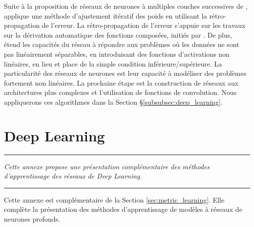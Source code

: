 Suite à la proposition de réseaux de neurones à multiples couches successives de \citeauthor{fukushima_neocognitron_1980} \cite{fukushima_neocognitron_1980}, \citeauthor{rumelhart_learning_1985} \cite{rumelhart_learning_1985} applique une méthode d'ajustement itératif des poids en utilisant la rétro-propagation de l'erreur.
La rétro-propagation de l'erreur s'appuie sur les travaux sur la dérivation automatique des fonctions composées, initiés par \citeauthor{linnainmaa_taylor_1976} \cite{linnainmaa_taylor_1976}.
De plus, \citeauthor{rumelhart_learning_1985} \cite{rumelhart_learning_1985} étend les capacités du réseau à répondre aux problèmes où les données ne sont pas linéairement séparables, en introduisant des fonctions d'activations non linéaires, en lieu et place de la simple condition inférieure/supérieure.
La particularité des réseaux de neurones est leur capacité à modéliser des problèmes fortement non linéaires.
La prochaine étape est la construction de réseaux aux architectures plus complexes et l'utilisation de fonctions de convolution.
Nous appliquerons ces algorithmes dans la Section §\ref{subsubsec:deep_learning}.


\FloatBarrier
\chapter{Deep Learning}
\label{Ann:deep_learning}

\begin{center}
	\rule{0.7\linewidth}{.5pt}
	\begin{minipage}{0.7\linewidth}
		\smallskip
		
		\textit{
			Cette annexe propose une présentation complémentaire des méthodes d'apprentissage des réseaux de \textit{Deep Learning}.
		}
		
	\end{minipage}
	\smallskip
	\rule{0.7\linewidth}{.5pt}
\end{center}

\bigskip

Cette annexe est complémentaire de la Section \ref{sec:metric_learning}.
Elle complète la présentation des méthodes d'apprentissage de modèles à réseaux de neurones profonds.


